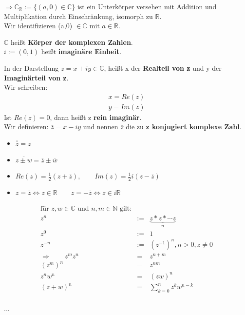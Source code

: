 $\Rightarrow \mathds{C}_{\mathds{R}}:= \{(a,0) \in \mathds{C}\}$ ist ein Unterkörper versehen mit Addition und Multiplikation durch Einschränkung, isomorph zu $\mathds{R}$.\\
Wir identifizieren (a,0) $\in \mathds{C}$ mit $a \in \mathds{R}$.\\

\begin{defi}
	$\mathds{C}$ heißt \textbf{Körper der komplexen Zahlen}.\\
	$i := (0,1)$ heißt \textbf{imaginäre Einheit}.
\end{defi}

In der Darstellung $z=x+iy \in \mathds{C}$, heißt x der \textbf{Realteil von z} und y der \textbf{Imaginärteil von z}.\\
Wir schreiben:
\begin{eqnarray*}
x= Re(z)\\
y = Im(z)
\end{eqnarray*}
Ist $Re(z) = 0$, dann heißt z \textbf{rein imaginär}.\\
Wir definieren: $\overline{z}= x-iy$ und nennen $\overline{z}$ die zu \textbf{z konjugiert komplexe Zahl}.\\
\begin{itemize}
	\item $\overline{\overline{z}} = z$
	\item $\overline{z \pm w} = \overline{z} \pm \overline{w}$
	\item $Re(z) = \frac{1}{2}(z + \overline{z}), \qquad Im(z)= \frac{1}{2}i(z-\overline{z})$
	\item $z=\overline{z} \Leftrightarrow z \in \mathds{R}\qquad z=-\overline{z} \Leftrightarrow z \in i\mathds{R}$
\end{itemize}

\begin{bemerkung}
\begin{eqnarray*}
	\text{für } z,w \in \mathds{C} \text{ und } n,m \in \mathds{N} \text{ gilt:}\\
	z^n &:=& \underbrace{z*z *\cdots z}_{n} \\
	z^0 &:=& 1\\
	z^{-n} &:=& (z^{-1})^{n}, n>0, z \neq 0\\
	\Rightarrow \qquad z^m z^n&=&z^{n+m}\\
	(z^m)^n &=& z^{nm}\\
	z^n w^n &=& (zw)^n\\
	(z+w)^n &=& \sum^n_{k=0} z^k w^{n-k}\\
\end{eqnarray*}

...\\
\end{bemerkung}

